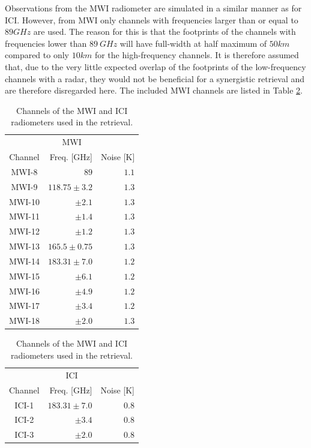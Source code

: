 \documentclass[journal abbreviation, manuscript]{copernicus}
\begin{document}
Observations from the MWI radiometer are simulated in a similar manner as for
ICI. However, from MWI only channels with frequencies larger than or equal to
$89 \unit{GHz}$ are used. The reason for this is that the footprints of the
channels with frequencies lower than $89\ \unit{GHz}$ will have full-width at
half maximum of $50 \unit{km}$ compared to only $10 \unit{km}$ for the
high-frequency channels. It is therefore assumed that, due to the very little
expected overlap of the footprints of the low-frequency channels with a radar,
they would not be beneficial for a synergistic retrieval and are therefore
disregarded here. The included MWI channels are listed in Table
\ref{tab:channels}.

\begin{table}[hbpt]
\caption{Channels of the MWI and ICI radiometers used in the retrieval.}
\label{tab:channels}
    \begin{tabular}{c|r|r}
    \multicolumn{3}{c}{MWI}\\
    Channel & Freq. [GHz] & Noise [K]\\
    \hline
    MWI-8  & $89$              & $1.1$ \\
    MWI-9  & $118.75 \pm 3.2$  & $1.3$ \\
    MWI-10 & $\pm 2.1$         & $1.3$ \\
    MWI-11 & $\pm 1.4$         & $1.3$ \\
    MWI-12 & $\pm 1.2$         & $1.3$ \\
    MWI-13 & $165.5 \pm 0.75$  & $1.3$ \\
    MWI-14 & $183.31 \pm 7.0$  & $1.2$ \\
    MWI-15 & $ \pm 6.1$        & $1.2$ \\
    MWI-16 & $ \pm 4.9$        & $1.2$ \\
    MWI-17 & $ \pm 3.4$        & $1.2$ \\
    MWI-18 & $ \pm 2.0$        & $1.3$ \\
    \end{tabular}%
    \hspace{1cm}%
    \begin{tabular}{c|r|r}
    \multicolumn{3}{c}{ICI}\\
    Channel & Freq. [GHz] & Noise [K] \\
    \hline
    ICI-1  & $183.31 \pm 7.0$ & $0.8$\\
    ICI-2  & $       \pm 3.4$ & $0.8$\\
    ICI-3  & $       \pm 2.0$ & $0.8$\\

\end{tabular}
\end{table}
\end{document}
